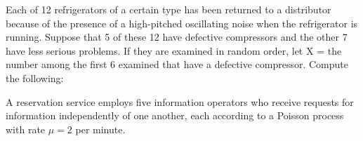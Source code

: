 \documentclass[letterpaper,12pt,addpoints]{exam}
\begin{document}
\begin{questions}

\clearpage
\question Each of 12 refrigerators of a certain type has been returned to a distributor because of the presence of a high-pitched oscillating noise when the refrigerator is running. Suppose that 5 of these 12 have defective compressors and the other 7 have less serious problems. If they are examined in random order, let X = the number among the first 6 examined that have a defective compressor. Compute the following:

\clearpage
\question A reservation service employs five information operators who receive requests for information independently of one another, each according to a Poisson process with rate $\mu=2$ per minute.

\end{questions}
\clearpage
\end{document}
